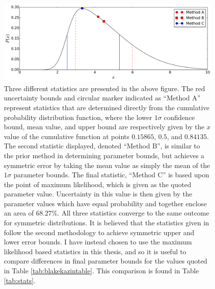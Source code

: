 \documentclass[titlesmallcaps, examinerscopy, copyrightpage]{uqthesis}
\begin{document}
\begin{figure}[h]
  \begin{center}
    \includegraphics[width=\textwidth]{images/stats.pdf}
  \end{center}
  \caption{Three different statistics are presented in the above figure. The red uncertainty bounds and circular marker indicated as ``Method A'' represent statistics that are determined directly from the cumulative probability distribution function, where the lower $1\sigma$ confidence bound, mean value, and upper bound are respectively given by the $x$ value of the cumulative function at points $0.15865$, $0.5$, and $0.84135$. The second statistic displayed, denoted ``Method B'', is similar to the prior method in determining parameter bounds, but achieves a symmetric error by taking the mean value as simply the mean of the $1\sigma$ parameter bounds. The final statistic, ``Method C'' is based upon the point of maximum likelihood, which is given as the quoted parameter value. Uncertainty in this value is then given by the parameter values which have equal probability and together enclose an area of $68.27\%$. All three statistics converge to the same outcome for symmetric distributions. It is believed that the statistics given in \citet{BlakeKazin2011} follow the second methodology to achieve symmetric upper and lower error bounds. I have instead chosen to use the maximum likelihood based statistics in this thesis, and so it is useful to compare differences in final parameter bounds for the values quoted in Table \ref{tab:blakekazintable}. This comparison is found in Table \ref{tab:stats}.}
  \label{fig:statistics}
\end{figure}
\end{document}
